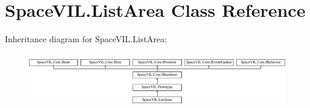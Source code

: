 \hypertarget{class_space_v_i_l_1_1_list_area}{}\section{Space\+V\+I\+L.\+List\+Area Class Reference}
\label{class_space_v_i_l_1_1_list_area}
Inheritance diagram for Space\+V\+I\+L.\+List\+Area\+:\begin{figure}[H]
\begin{center}
\leavevmode
\includegraphics[height=2.421622cm]{class_space_v_i_l_1_1_list_area}
\end{center}
\end{figure}
